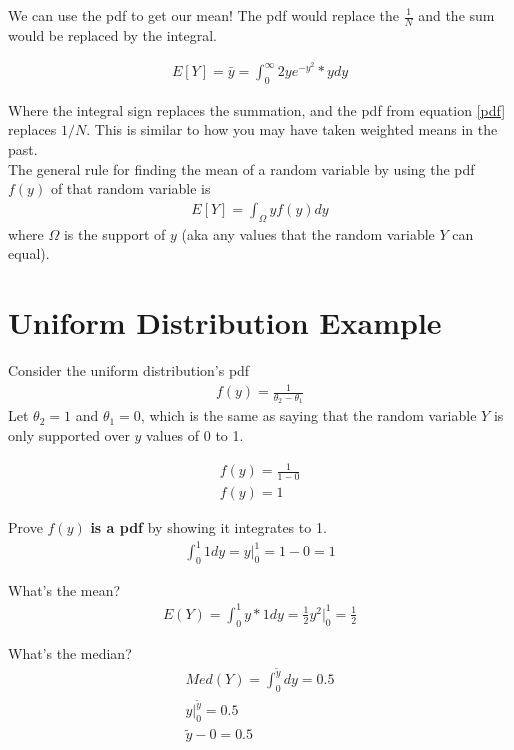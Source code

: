 \documentclass{article}
\begin{document}
We can use the pdf to get our mean! The pdf would replace the $\frac{1}{N}$ and the sum would be replaced by the integral. 

\begin{align}
    E[Y]= \bar y = \int_0^\infty 2ye^{-y^2} * y dy
\end{align}

Where the integral sign replaces the summation, and the pdf from equation \ref{pdf} replaces $1/N$. This is similar to how you may have taken weighted means in the past. \\

The general rule for finding the mean of a random variable by using the pdf $f(y)$ of that random variable is 
\begin{align}
    E[Y] = \int_\Omega y f(y) dy
\end{align}
where $\Omega$ is the support of $y$ (aka any values that the random variable $Y$ can equal). \\


\section{Uniform Distribution Example}
Consider the uniform distribution's pdf 
\begin{align}
    f(y) = \frac{1}{\theta_2 - \theta_1} \label{unif_pdf}
\end{align}
Let $\theta_2 = 1$ and $\theta_1 = 0$, which is the same as saying that the random variable $Y$ is only supported over $y$ values of 0 to 1. 

\begin{align}
    f(y) = \frac{1}{1 - 0}\\
    f(y) = 1
\end{align}

Prove $f(y)$ \textbf{is a pdf} by showing it integrates to 1. 
\begin{align}
    \int_0^1 1 dy = y \bigg|_0^1 = 1 - 0 = 1
\end{align}

What's the mean? 
\begin{align}
    E(Y) = \int_0^1 y *1 dy = \frac{1}{2} y^2 \bigg|_0^1 = \frac{1}{2}
\end{align}

What's the median? 
\begin{align}
    Med(Y) = \int_0^{\tilde y} dy = 0.5 \\
    y\bigg|_0^{\tilde y} = 0.5 \\
    \tilde y - 0 = 0.5
\end{align}
\end{document}
